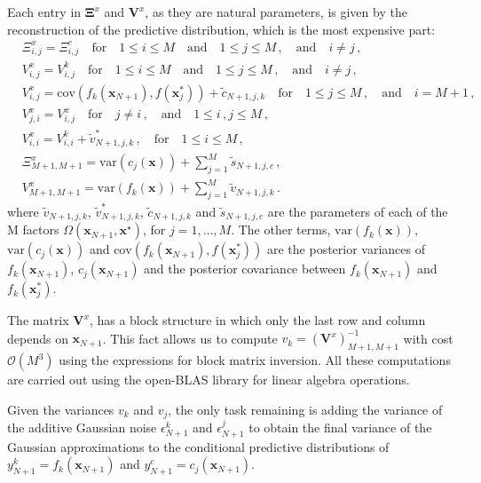 Each entry in $\boldsymbol{\Xi}^x$ and $\boldsymbol{V}^x$, as they are natural parameters, is given by the reconstruction of the predictive distribution, which is the most expensive part:
\begin{align}
    & \Xi_{i,j}^{x} = \Xi_{i,j}^{c} \quad \textrm{for} \quad 1 \leq i \leq M \quad \textrm{and} \quad 1 \leq j \leq M \,, \quad \textrm{and} \quad i \neq j \,, \nonumber \\
    & V_{i,j}^{x} = V_{i,j}^{k}  \quad \textrm{for} \quad 1 \leq i \leq M \quad \textrm{and} \quad 1 \leq j \leq M \,, \quad \textrm{and} \quad i \neq j \,, \nonumber \\
    & V_{i,j}^{x} = \textrm{cov} (f_k(\textbf{x}_{N+1}),f(\textbf{x}_{j}^{*})) + \tilde{c}_{N+1,j,k} \quad \textrm{for} \quad 1 \leq j \leq M \,, \quad \textrm{and} \quad i = M+1 \,, \nonumber \\ 
    & V_{j,i}^{x} = V_{i,j}^{x} \quad \textrm{for} \quad j \neq i\,, \quad \textrm{and} \quad 1 \leq i\,,j \leq M \,, \nonumber \\
    & V_{i,i}^{x} = V_{i,i}^{k} + \tilde{v}_{N+1,j,k}^{*}\,, \quad \textrm{for} \quad 1 \leq i \leq M \,, \nonumber \\
    & \Xi_{M+1,M+1}^{x} = \textrm{var}(c_j(\textbf{x})) + \sum_{j=1}^{M}\tilde{s}_{N+1,j,c} \,, \nonumber \\
    & V_{M+1,M+1}^{x} = \textrm{var}(f_k(\textbf{x})) + \sum_{j=1}^{M}\tilde{v}_{N+1,j,k}\,. 
\end{align}
where $\tilde{v}_{N+1,j,k}$, $\tilde{v}_{N+1,j,k}^{*}$, $\tilde{c}_{N+1,j,k}$ and $\tilde{s}_{N+1,j,c}$ are the parameters of each of the M factors $\Omega(\textbf{x}_{N+1},\textbf{x}^{\star})$, for $j = 1,\ldots,M$. The other terms, $\textrm{var}(f_k(\textbf{x}))$,
$\textrm{var}(c_j(\textbf{x}))$ and $\textrm{cov} (f_k(\textbf{x}_{N+1}),f(\textbf{x}_{j}^{*}))$ are the posterior variances of $f_k(\textbf{x}_{N+1})$, $c_j(\textbf{x}_{N+1})$ and the posterior covariance between $f_k(\textbf{x}_{N+1})$ and $f_k(\textbf{x}_{j}^{*})$.

The matrix $\textbf{V}^x$, has a block structure in which only the last row and column depends on $\textbf{x}_{N+1}$. This fact allows us to compute $v_k = (\textbf{V}^x)_{M+1,M+1}^{-1}$ with cost $\mathcal{O}(M^3)$ using the expressions for block matrix inversion. All these computations are carried out using the open-BLAS library for linear algebra operations.

Given the variances $v_k$ and $v_j$, the only task remaining is adding the variance of the additive Gaussian noise $\epsilon_{N+1}^{k}$ and $\epsilon_{N+1}^{j}$ to obtain the final variance of the Gaussian approximations to the conditional predictive distributions of $y_{N+1}^{k} = f_k(\boldsymbol{x}_{N+1})$ and $y_{N+1}^{c} = c_j(\boldsymbol{x}_{N+1})$.

